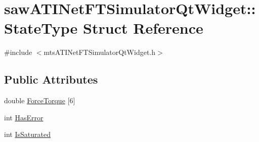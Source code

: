 \hypertarget{structsaw_a_t_i_net_f_t_simulator_qt_widget_1_1_state_type}{\section{saw\-A\-T\-I\-Net\-F\-T\-Simulator\-Qt\-Widget\-:\-:State\-Type Struct Reference}
\label{structsaw_a_t_i_net_f_t_simulator_qt_widget_1_1_state_type}
}


{\ttfamily \#include $<$mts\-A\-T\-I\-Net\-F\-T\-Simulator\-Qt\-Widget.\-h$>$}

\subsection*{Public Attributes}
\begin{DoxyCompactItemize}
\item 
double \hyperlink{structsaw_a_t_i_net_f_t_simulator_qt_widget_1_1_state_type_a35c15358a15e40af1694f21cd1491047}{Force\-Torque} \mbox{[}6\mbox{]}
\item 
int \hyperlink{structsaw_a_t_i_net_f_t_simulator_qt_widget_1_1_state_type_a925e0470df910c25663522859098dda1}{Has\-Error}
\item 
int \hyperlink{structsaw_a_t_i_net_f_t_simulator_qt_widget_1_1_state_type_a19ae7097d11b97f925c2bf94ce599100}{Is\-Saturated}
\end{DoxyCompactItemize}


